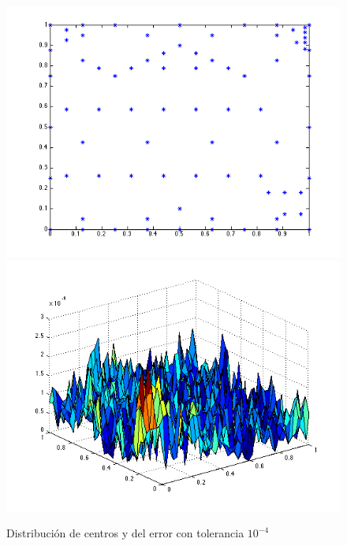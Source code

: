 \documentclass[11pt,a4paper]{article}
\begin{document}
\begin{figure}[H]
\begin{center}
\includegraphics[scale=.4]{edp1_tol4.png}
\includegraphics[scale=.4]{error_edp1_tol4.png}
\caption{Distribución de centros y del error con tolerancia $10^{-4}$}
\end{center}
\end{figure}
\end{document}

